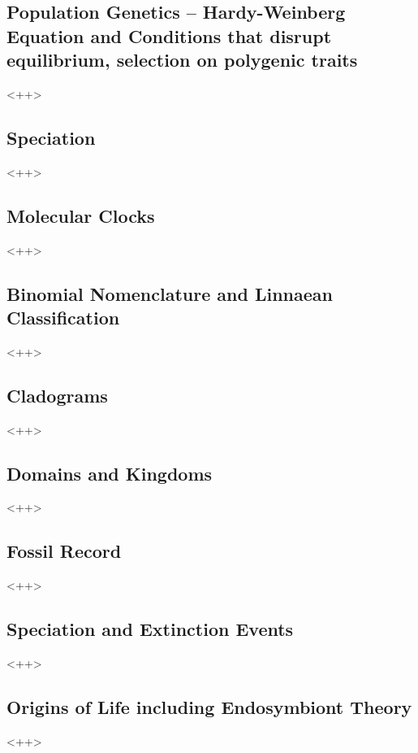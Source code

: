 \documentclass{article}
\begin{document}
\subsection{Population Genetics -- Hardy-Weinberg Equation and Conditions that disrupt equilibrium, selection on polygenic traits}
<++>

\subsection{Speciation}
<++>

\subsection{Molecular Clocks}
<++>

\subsection{Binomial Nomenclature and Linnaean Classification}
<++>

\subsection{Cladograms}
<++>

\subsection{Domains and Kingdoms}
<++>

\subsection{Fossil Record}
<++>

\subsection{Speciation and Extinction Events}
<++>

\subsection{Origins of Life including Endosymbiont Theory}
<++>
\end{document}
